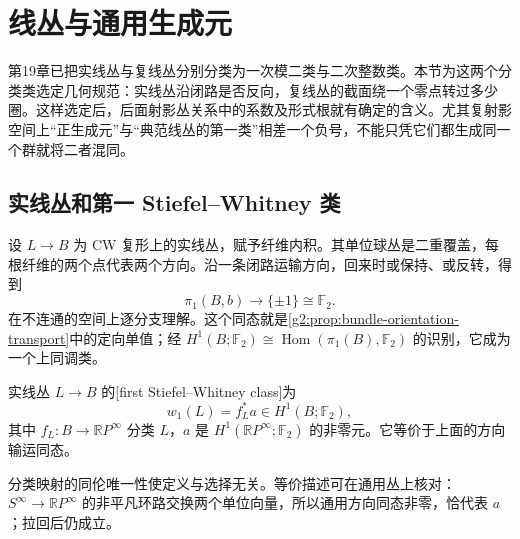 
% 
% 

\section{线丛与通用生成元}
\label{g2:sec:2101}

第19章已把实线丛与复线丛分别分类为一次模二类与二次整数类。本节为这两个分类类选定几何规范：实线丛沿闭路是否反向，复线丛的截面绕一个零点转过多少圈。这样选定后，后面射影丛关系中的系数及形式根就有确定的含义。尤其复射影空间上“正生成元”与“典范线丛的第一类”相差一个负号，不能只凭它们都生成同一个群就将二者混同。

\subsection{实线丛和第一 Stiefel–Whitney 类}
\label{g2:subsec:2101:01}
设 \(L\to B\) 为 CW 复形上的实线丛，赋予纤维内积。其单位球丛是二重覆盖，每根纤维的两个点代表两个方向。沿一条闭路运输方向，回来时或保持、或反转，得到
\[
	\pi_1(B,b)\longrightarrow\{\pm1\}\cong\mathbb F_2.
\]
在不连通的空间上逐分支理解。这个同态就是\cref{g2:prop:bundle-orientation-transport}中的定向单值；经 \(H^1(B;\mathbb F_2)\cong\operatorname{Hom}(\pi_1(B),\mathbb F_2)\) 的识别，它成为一个上同调类。

\begin{definition}\label{g2:def:first-stiefel-whitney-line}
	实线丛 \(L\to B\) 的[first Stiefel--Whitney class]为
	\[
		w_1(L)=f_L^*a\in H^1(B;\mathbb F_2),
	\]
	其中 \(f_L:B\to\mathbb RP^\infty\) 分类 \(L\)，\(a\) 是 \(H^1(\mathbb RP^\infty;\mathbb F_2)\) 的非零元。它等价于上面的方向输运同态。
\end{definition}

分类映射的同伦唯一性使定义与选择无关。等价描述可在通用丛上核对：\(S^\infty\to\mathbb RP^\infty\) 的非平凡环路交换两个单位向量，所以通用方向同态非零，恰代表 \(a\)；拉回后仍成立。

